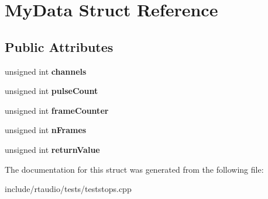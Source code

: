 \hypertarget{struct_my_data}{}\section{My\+Data Struct Reference}
\label{struct_my_data}
\subsection*{Public Attributes}
\begin{DoxyCompactItemize}
\item 
unsigned int {\bfseries channels}\hypertarget{struct_my_data_a4fe6eb7d4671042565d506f05093784b}{}\label{struct_my_data_a4fe6eb7d4671042565d506f05093784b}

\item 
unsigned int {\bfseries pulse\+Count}\hypertarget{struct_my_data_a31659b7089c134cd4e6a080cc867520c}{}\label{struct_my_data_a31659b7089c134cd4e6a080cc867520c}

\item 
unsigned int {\bfseries frame\+Counter}\hypertarget{struct_my_data_ac5f5fe1112b93403f78779c9b99e7af3}{}\label{struct_my_data_ac5f5fe1112b93403f78779c9b99e7af3}

\item 
unsigned int {\bfseries n\+Frames}\hypertarget{struct_my_data_a2d78a97ef861afd72c77f1a1f9b01c2d}{}\label{struct_my_data_a2d78a97ef861afd72c77f1a1f9b01c2d}

\item 
unsigned int {\bfseries return\+Value}\hypertarget{struct_my_data_a133383f089988229a6698f2b14b6f265}{}\label{struct_my_data_a133383f089988229a6698f2b14b6f265}

\end{DoxyCompactItemize}


The documentation for this struct was generated from the following file\+:\begin{DoxyCompactItemize}
\item 
include/rtaudio/tests/teststops.\+cpp\end{DoxyCompactItemize}

